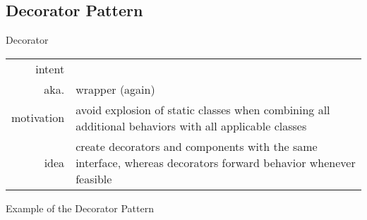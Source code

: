 \subsection{Decorator Pattern}
\begin{frame}{\insertsubsection}
	\begin{fancycolumns}
		\begin{definition}{Decorator \mysource{\gof}}
			\setlength\tabcolsep{1mm}
			\begin{tabularx}{\textwidth}{rX}				
				intent & \mycite{Attach additional responsibilities to an object dynamically. Decorators provide a flexible alternative to subclassing for extending functionality.}\\
				aka. & wrapper (again)\\
				motivation & avoid explosion of static classes when combining all additional behaviors with all applicable classes\\
				idea & create decorators and components with the same interface, whereas decorators forward behavior whenever feasible
			\end{tabularx}
		\end{definition}
		\nextcolumn
	\end{fancycolumns}
\end{frame}

\begin{frame}{Example of the Decorator Pattern }
	\centering\decoratorexample{height=60mm}
\end{frame}


%	


